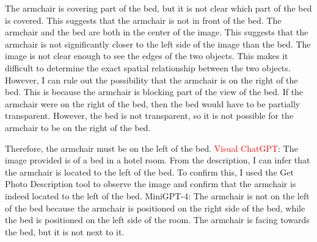 \begin{enumerate}
    The armchair is covering part of the bed, but it is not clear which part of the bed is covered. This suggests that the armchair is not in front of the bed.
    The armchair and the bed are both in the center of the image. This suggests that the armchair is not significantly closer to the left side of the image than the bed.
    The image is not clear enough to see the edges of the two objects. This makes it difficult to determine the exact spatial relationship between the two objects.
    However, I can rule out the possibility that the armchair is on the right of the bed. This is because the armchair is blocking part of the view of the bed. If the armchair were on the right of the bed, then the bed would have to be partially transparent. However, the bed is not transparent, so it is not possible for the armchair to be on the right of the bed.

    Therefore, the armchair must be on the left of the bed.
    \subitem \textcolor{red}{Visual ChatGPT}: The image provided is of a bed in a hotel room. From the description, I can infer that the armchair is located to the left of the bed. To confirm this, I used the Get Photo Description tool to observe the image and confirm that the armchair is indeed located to the left of the bed.
    \subitem MiniGPT-4: The armchair is not on the left of the bed because the armchair is positioned on the right side of the bed, while the bed is positioned on the left side of the room. The armchair is facing towards the bed, but it is not next to it.
\end{enumerate}

